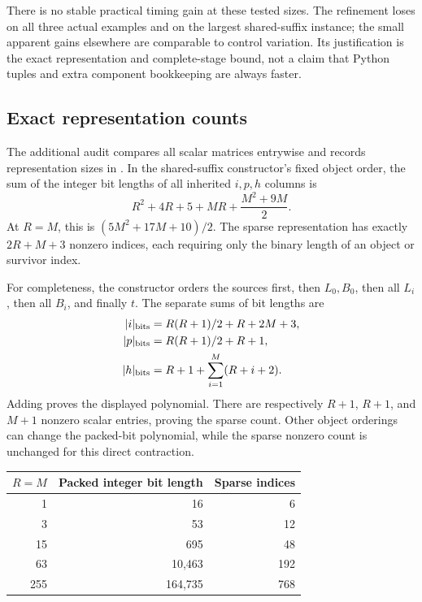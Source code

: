 There is no stable practical timing gain at these tested sizes. The
refinement loses on all three actual examples and on the largest
shared-suffix instance; the small apparent gains elsewhere are
comparable to control variation. Its justification is the exact
representation and complete-stage bound, not a claim that Python
tuples and extra component bookkeeping are always faster.

\subsection{Exact representation counts}

The additional audit
 compares all scalar
matrices entrywise and records representation sizes in
. In the
shared-suffix constructor's fixed object order, the sum of the
integer bit lengths of all inherited \(i,p,h\) columns is
\[
 R^2+4R+5+MR+\frac{M^2+9M}{2}.
\]
At \(R=M\), this is \((5M^2+17M+10)/2\). The sparse representation
has exactly \(2R+M+3\) nonzero indices, each requiring only the
binary length of an object or survivor index.

For completeness, the constructor orders the sources first, then
\(L_0,B_0\), then all \(L_i\), then all \(B_i\), and finally
\(t\). The separate sums of bit lengths are
\[
\begin{aligned}
 |i|_{\rm bits}&=R(R+1)/2+R+2M+3,\\
 |p|_{\rm bits}&=R(R+1)/2+R+1,\\
 |h|_{\rm bits}&=R+1+\sum_{i=1}^{M}(R+i+2).
\end{aligned}
\]
Adding proves the displayed polynomial. There are respectively
\(R+1\), \(R+1\), and \(M+1\) nonzero scalar entries, proving the
sparse count. Other object orderings can change the packed-bit
polynomial, while the sparse nonzero count is unchanged for this
direct contraction.

\begin{center}
\small
\begin{tabular}{@{}rrr@{}}
\toprule
\(R=M\) & Packed integer bit length & Sparse indices\\
\midrule
1 & 16 & 6\\
3 & 53 & 12\\
15 & 695 & 48\\
63 & 10,463 & 192\\
255 & 164,735 & 768\\
\bottomrule
\end{tabular}
\end{center}

